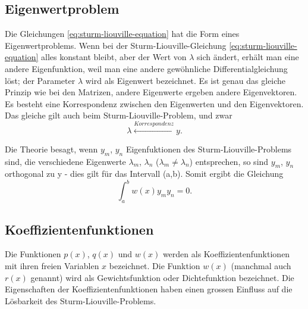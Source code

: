 \subsection{Eigenwertproblem}
Die Gleichungen \eqref{eq:sturm-liouville-equation} hat die Form eines
Eigenwertproblems.
Wenn bei der Sturm-Liouville-Gleichung \eqref{eq:sturm-liouville-equation} alles
konstant bleibt, aber der Wert von $\lambda$ sich ändert, erhält man eine andere
Eigenfunktion, weil man eine andere gewöhnliche Differentialgleichung löst;
der Parameter $\lambda$ wird als Eigenwert bezeichnet.
Es ist genau das gleiche Prinzip wie bei den Matrizen, andere Eigenwerte ergeben
andere Eigenvektoren.
Es besteht eine Korrespondenz zwischen den Eigenwerten und den Eigenvektoren.
Das gleiche gilt auch beim Sturm-Liouville-Problem, und zwar
\begin{equation}
	\lambda \overset{Korrespondenz}\leftrightarrow y.
\end{equation}

Die Theorie besagt, wenn $y_m$, $y_n$ Eigenfuktionen des
Sturm-Liouville-Problems sind, die verschiedene Eigenwerte $\lambda_m$,
$\lambda_n$ ($\lambda_m \neq \lambda_n$) entsprechen, so sind $y_m$, $y_n$
orthogonal zu y -
dies gilt für das Intervall (a,b).
Somit ergibt die Gleichung
\begin{equation}
	\label{eq:skalar-sturm-liouville}
	\int_{a}^{b} w(x)y_m y_n = 0.
\end{equation}

\subsection{Koeffizientenfunktionen}
Die Funktionen $p(x)$, $q(x)$ und $w(x)$ werden als Koeffizientenfunktionen mit
ihren freien Variablen $x$ bezeichnet.
Die Funktion $w(x)$ (manchmal auch $r(x)$ genannt) wird als Gewichtsfunktion
oder Dichtefunktion bezeichnet.
Die Eigenschaften der Koeffizientenfunktionen haben einen grossen Einfluss auf
die Lösbarkeit des Sturm-Liouville-Problems.

%
%

